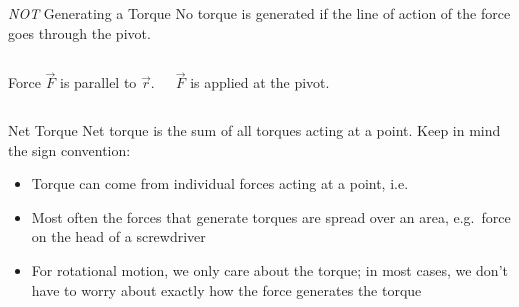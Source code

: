 \documentclass[12pt,compress,aspectratio=169]{beamer}
\begin{document}
\begin{frame}{\emph{NOT} Generating a Torque}
  No torque is generated if the line of action of the force goes through the
  pivot.
  \begin{columns}[T]
    \centering
    \vspace{.45in}

    \vspace{.03in}
    {\footnotesize Force $\vec F$ is parallel to $\vec r$.\par}

    \centering

    {\footnotesize $\vec F$ is applied at the pivot.\par}
  \end{columns}
\end{frame}



\begin{frame}{Net Torque}
  Net torque is the sum of all torques acting at a point. Keep in mind the sign
  convention:

  \begin{itemize}
  \item Torque can come from individual forces acting at a point, i.e.


  \item\vspace{-.15in} Most often the forces that generate torques are spread
    over an area, e.g.\ force on the head of a screwdriver
  \item For rotational motion, we only care about the torque; in most cases,
    we don't have to worry about exactly how the force generates the torque
  \end{itemize}
\end{frame}
\end{document}
